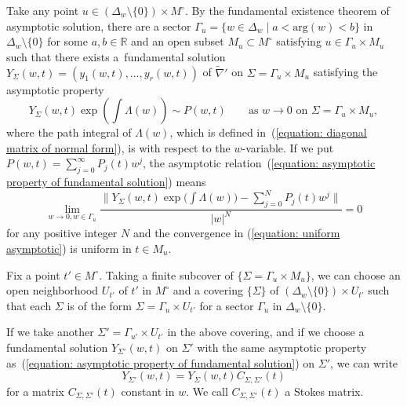 \documentclass[pdftex]{sigma}
\numberwithin{equation}{section}
\begin{document}
Take any point
$u\in (\Delta_w\setminus\{0\})\times M^{\circ}$.
By the fundamental existence theorem \cite[Theorem~12.1]{Wasow}
of asymptotic solution,
there are a sector $\Gamma_u=\{w\in\Delta_w \mid a<\mathrm{arg}(w)<b\}$
in $\Delta_w\setminus\{0\}$ for some $a,b\in\mathbb{R}$
and an open subset $M_u\subset M^{\circ}$
satisfying $u \in \Gamma_u\times M_u$
such that there exists
a~fundamental solution
$Y_{\Sigma}(w,t)=(y_1(w,t),\dots,y_r(w,t))$
of $\tilde{\nabla}'$ on $\Sigma=\Gamma_u\times M_u$
satisfying the asymptotic property
\begin{equation} \label{equation: asymptotic property of fundamental solution}
 Y_{\Sigma}(w,t)
 \exp \left(\int\Lambda(w)\right)
 \sim
 P(w,t)
 \qquad
 \text{as $w\to 0$ on $\Sigma=\Gamma_u\times M_u$},
\end{equation}
where the path integral of $\Lambda(w)$, which is defined in~(\ref{equation: diagonal matrix of normal form}),
is with respect to the $w$-variable.
If we put $P(w,t)=\sum_{j=0}^{\infty} P_j(t) w^j$,
the asymptotic relation~(\ref{equation: asymptotic property of fundamental solution}) means
\begin{equation} \label{equation: uniform asymptotic}
 \lim_{w\to 0, w\in\Gamma_u}
 \frac{ \big\| Y_{\Sigma}(w,t)\exp \big( \int\Lambda(w) \big)
 -\sum_{j=0}^N P_j(t) w^j \big\| } { |w|^N }
 =0
\end{equation}
for any positive integer $N$
and the convergence in (\ref{equation: uniform asymptotic})
is uniform in $t\in M_u$.

Fix a point $t'\in M^{\circ}$.
Taking a finite subcover of $\{\Sigma=\Gamma_u\times M_u\}$,
we can choose an open neighborhood $U_{t'}$ of $t'$ in $M^{\circ}$
and a covering
$\{\Sigma\}$ of $(\Delta_w\setminus\{0\})\times U_{t'}$
such that each $\Sigma$ is of the form
$\Sigma=\Gamma_u\times U_{t'}$
for a sector $\Gamma_u$ in $\Delta_w\setminus\{0\}$.

If we take another $\Sigma'=\Gamma_{u'}\times U_{t'}$
in the above covering,
and if we choose a fundamental solution $Y_{\Sigma'}(w,t)$
on $\Sigma'$
with the same asymptotic property as~(\ref{equation: asymptotic property of fundamental solution})
on $\Sigma'$,
we can write
\begin{equation} \label{equation: comparison of fundamental solutions with asymptotic}
 Y_{\Sigma'}(w,t)=Y_{\Sigma}(w,t) C_{\Sigma,\Sigma'}(t)
\end{equation}
for a matrix $C_{\Sigma,\Sigma'}(t)$
constant in $w$.
We call $C_{\Sigma,\Sigma'}(t)$ a Stokes matrix.
\end{document}
